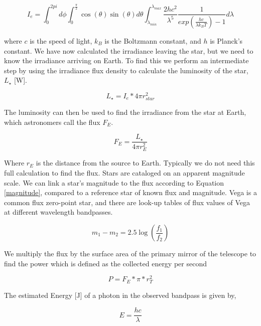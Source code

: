 \begin{equation}
    I_e=\int_{0}^{2pi} d\phi \int_{0}^{\frac{\pi}{2}} \cos(\theta)\sin(\theta)d\theta \int_{\lambda_{min}}^{\lambda_{max}} \frac{2hc^2}{\lambda^5}\frac{1}{exp(\frac{hc}{\lambda k_B T})-1} d\lambda
\end{equation}

where $c$ is the speed of light, $k_B$ is the Boltzmann constant, and $h$ is Planck's constant. We have now calculated the irradiance leaving the star, but we need to know the irradiance arriving on Earth. To find this we perform an intermediate step by using the irradiance flux density to calculate the luminosity of the star, $L_{\star}$ [W].

\begin{equation}
    L_{\star}=I_e*4\pi r_{star}^2
\end{equation}

The luminosity can then be used to find the irradiance from the star at Earth, which astronomers call the flux $F_{E}$.

\begin{equation}
    F_{E}=\frac{L_{\star}}{4\pi r_{E}^2}
\end{equation}

Where $r_{E}$ is the distance from the source to Earth. Typically we do not need this full calculation to find the flux. Stars are cataloged on an apparent magnitude scale. We can link a star's magnitude to the flux according to Equation \ref{magnitude}, compared to a reference star of known flux and magnitude. Vega is a common flux zero-point star, and there are look-up tables of flux values of Vega at different wavelength bandpasses. 

\begin{equation}
    m_1-m_2=
    2.5 \log\left(
        \frac{f_1}{f_2}
    \right)
    \label{magnitude}
\end{equation}

 We multiply the flux by the surface area of the primary mirror of the telescope to find the power which is defined as the collected energy per second

\begin{equation}
    P=F_{E}*\pi*r_T^2
\end{equation}

The estimated Energy [J] of a photon in the observed bandpass is given by,

\begin{equation}
    E=\frac{hc}{\lambda}
\end{equation}

